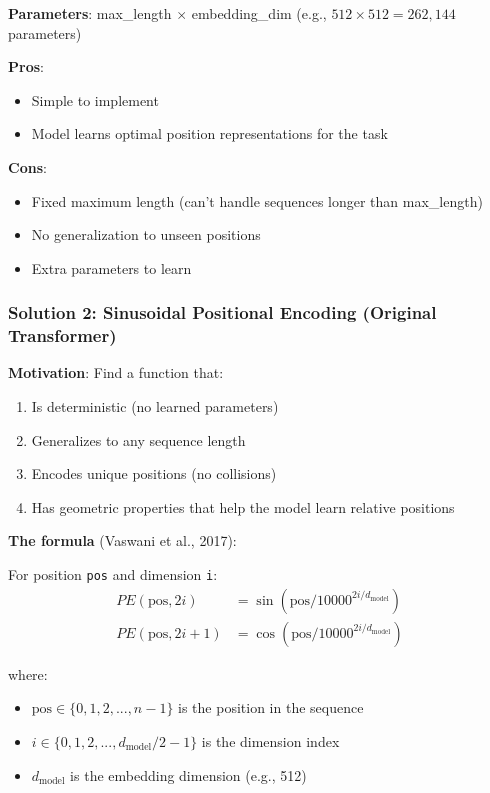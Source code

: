 \documentclass[11pt,oneside]{book}
\begin{document}
\textbf{Parameters}: max\_length $\times$ embedding\_dim (e.g., $512 \times 512 = 262,144$ parameters)

\textbf{Pros}:
\begin{itemize}
\item Simple to implement
\item Model learns optimal position representations for the task
\end{itemize}

\textbf{Cons}:
\begin{itemize}
\item Fixed maximum length (can't handle sequences longer than max\_length)
\item No generalization to unseen positions
\item Extra parameters to learn
\end{itemize}

\subsubsection{Solution 2: Sinusoidal Positional Encoding (Original Transformer)}

\textbf{Motivation}: Find a function that:
\begin{enumerate}
\item Is deterministic (no learned parameters)
\item Generalizes to any sequence length
\item Encodes unique positions (no collisions)
\item Has geometric properties that help the model learn relative positions
\end{enumerate}

\textbf{The formula} (Vaswani et al., 2017):

For position \texttt{pos} and dimension \texttt{i}:
\begin{align*}
PE(\text{pos}, 2i) &= \sin(\text{pos} / 10000^{2i/d_{\text{model}}}) \\
PE(\text{pos}, 2i+1) &= \cos(\text{pos} / 10000^{2i/d_{\text{model}}})
\end{align*}

where:
\begin{itemize}
\item $\text{pos} \in \{0, 1, 2, ..., n-1\}$ is the position in the sequence
\item $i \in \{0, 1, 2, ..., d_{\text{model}}/2 - 1\}$ is the dimension index
\item $d_{\text{model}}$ is the embedding dimension (e.g., 512)
\end{itemize}
\end{document}
